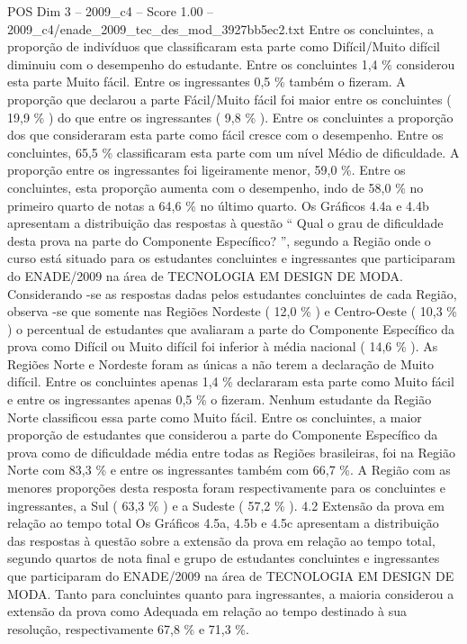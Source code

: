 \begin{textsample}{POS Dim 3 – 2009\_c4 – Score 1.00 – 2009\_c4/enade\_2009\_tec\_des\_mod\_3927bb5ec2.txt}
Entre os concluintes, a proporção de indivíduos que classificaram esta parte como Difícil/Muito difícil diminuiu com o desempenho do estudante.
Entre os concluintes 1,4 \% considerou esta parte Muito fácil.
Entre os ingressantes 0,5 \% também o fizeram.
A proporção que declarou a parte Fácil/Muito fácil foi maior entre os concluintes ( 19,9 \% ) do que entre os ingressantes ( 9,8 \% ).
Entre os concluintes a proporção dos que consideraram esta parte como fácil cresce com o desempenho.
Entre os concluintes, 65,5 \% classificaram esta parte com um nível Médio de dificuldade.
A proporção entre os ingressantes foi ligeiramente menor, 59,0 \%.
Entre os concluintes, esta proporção aumenta com o desempenho, indo de 58,0 \% no primeiro quarto de notas a 64,6 \% no último quarto.
Os Gráficos 4.4a e 4.4b apresentam a distribuição das respostas à questão “ Qual o grau de dificuldade desta prova na parte do Componente Específico? ”, segundo a Região onde o curso está situado para os estudantes concluintes e ingressantes que participaram do ENADE/2009 na área de TECNOLOGIA EM DESIGN DE MODA.
Considerando -se as respostas dadas pelos estudantes concluintes de cada Região, observa -se que somente nas Regiões Nordeste ( 12,0 \% ) e Centro-Oeste ( 10,3 \% ) o percentual de estudantes que avaliaram a parte do Componente Específico da prova como Difícil ou Muito difícil foi inferior à média nacional ( 14,6 \% ).
As Regiões Norte e Nordeste foram as únicas a não terem a declaração de Muito difícil.
Entre os concluintes apenas 1,4 \% declararam esta parte como Muito fácil e entre os ingressantes apenas 0,5 \% o fizeram.
Nenhum estudante da Região Norte classificou essa parte como Muito fácil.
Entre os concluintes, a maior proporção de estudantes que considerou a parte do Componente Específico da prova como de dificuldade média entre todas as Regiões brasileiras, foi na Região Norte com 83,3 \% e entre os ingressantes também com 66,7 \%.
A Região com as menores proporções desta resposta foram respectivamente para os concluintes e ingressantes, a Sul ( 63,3 \% ) e a Sudeste ( 57,2 \% ). 4.2 Extensão da prova em relação ao tempo total Os Gráficos 4.5a, 4.5b e 4.5c apresentam a distribuição das respostas à questão sobre a extensão da prova em relação ao tempo total, segundo quartos de nota final e grupo de estudantes concluintes e ingressantes que participaram do ENADE/2009 na área de TECNOLOGIA EM DESIGN DE MODA.
Tanto para concluintes quanto para ingressantes, a maioria considerou a extensão da prova como Adequada em relação ao tempo destinado à sua resolução, respectivamente 67,8 \% e 71,3 \%.

\end{textsample}
